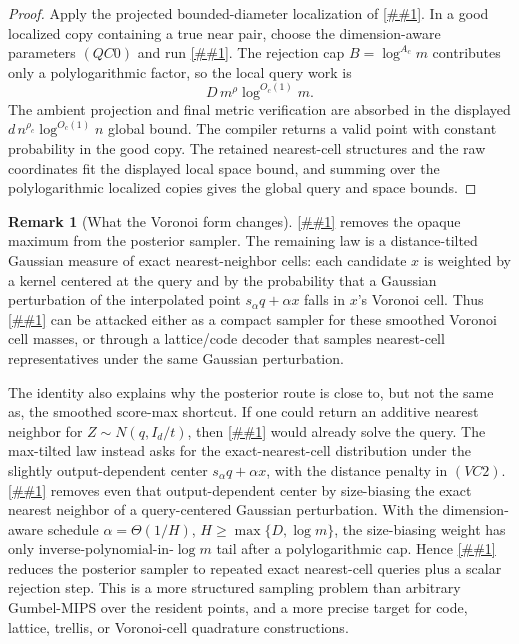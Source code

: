 \documentclass[10pt]{article}
\newcommand{\cref}[1]{\ref{##1}}
\newcommand{\Cref}[1]{\ref{##1}}
\theoremstyle{definition}
\newtheorem{remark}[theorem]{Remark}
\begin{document}
\begin{proof}
   Apply the projected bounded-diameter localization of
   \cref{lem:localization}.  In a good localized copy containing a true near
   pair, choose the dimension-aware parameters \((QC0)\) and run
   \cref{cor:truncated-nearest-cell-compiler}.  The rejection cap
   \(B=\log^{A_c}m\) contributes only a polylogarithmic factor, so the local
   query work is
   \[
      D\,m^\rho\log^{O_c(1)}m .
   \]
   The ambient projection and final metric verification are absorbed in the
   displayed \(d\,n^{\rho_c}\log^{O_c(1)}n\) global bound.  The compiler
   returns a valid point with constant probability in the good copy.  The
   retained nearest-cell structures and the raw coordinates fit the displayed
   local space bound, and summing over the polylogarithmic localized copies
   gives the global query and space bounds.
\end{proof}

\begin{remark}[What the Voronoi form changes]
   \label{rem:alpha-leader-voronoi-capture}
   \Cref{lem:alpha-leader-voronoi-capture} removes the opaque maximum from the
   posterior sampler.  The remaining law is a distance-tilted Gaussian measure
   of exact nearest-neighbor cells:
   each candidate \(x\) is weighted by a kernel centered at the query and by
   the probability that a Gaussian perturbation of the interpolated point
   \(s_\alpha q+\alpha x\) falls in \(x\)'s Voronoi cell.  Thus
   \cref{asm:alpha-leader-sampler} can be attacked either as a compact
   sampler for these smoothed Voronoi cell masses, or through a lattice/code
   decoder that samples nearest-cell representatives under the same Gaussian
   perturbation.

   The identity also explains why the posterior route is close to, but not the
   same as, the smoothed score-max shortcut.  If one could return an additive
   nearest neighbor for \(Z\sim N(q,I_d/t)\), then
   \cref{lem:smoothed-max-score-margin} would already solve the query.  The
   max-tilted law instead asks for the exact-nearest-cell distribution under
   the slightly output-dependent center \(s_\alpha q+\alpha x\), with the
   distance penalty in \((VC2)\).  \Cref{cor:query-centered-cell-reweighting}
   removes even that output-dependent center by size-biasing the exact nearest
   neighbor of a query-centered Gaussian perturbation.  With the
   dimension-aware schedule \(\alpha=\Theta(1/H)\),
   \(H\ge\max\{D,\log m\}\), the size-biasing weight has only
   inverse-polynomial-in-\(\log m\) tail after a polylogarithmic cap.  Hence
   \cref{cor:truncated-nearest-cell-compiler} reduces the posterior sampler to
   repeated exact nearest-cell queries plus a scalar rejection step.  This is a
   more structured sampling problem than arbitrary Gumbel-MIPS over the
   resident points, and a more precise target for code, lattice, trellis, or
   Voronoi-cell quadrature constructions.
\end{remark}
\end{document}
